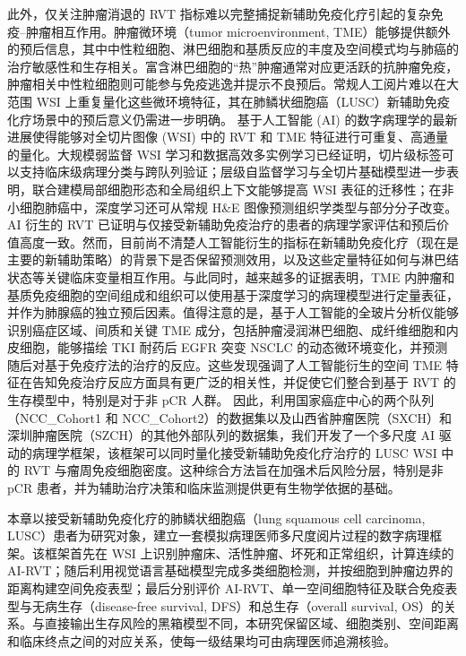 此外，仅关注肿瘤消退的 RVT 指标难以完整捕捉新辅助免疫化疗引起的复杂免疫--肿瘤相互作用。肿瘤微环境（tumor microenvironment, TME）能够提供额外的预后信息，其中中性粒细胞、淋巴细胞和基质反应的丰度及空间模式均与肺癌的治疗敏感性和生存相关\cite{wu2024coldhot,teijeira2021il8,miao2024neutrophilsnsclc,hu2025neutrophilpd1}。富含淋巴细胞的“热”肿瘤通常对应更活跃的抗肿瘤免疫\cite{wu2024coldhot}，肿瘤相关中性粒细胞则可能参与免疫逃逸并提示不良预后\cite{teijeira2021il8,miao2024neutrophilsnsclc,hu2025neutrophilpd1}。常规人工阅片难以在大范围 WSI 上重复量化这些微环境特征，其在肺鳞状细胞癌（LUSC）新辅助免疫化疗场景中的预后意义仍需进一步明确。
基于人工智能 (AI) 的数字病理学的最新进展使得能够对全切片图像 (WSI) 中的 RVT 和 TME 特征进行可重复、高通量的量化。大规模弱监督 WSI 学习和数据高效多实例学习已经证明，切片级标签可以支持临床级病理分类与跨队列验证\cite{campanella2019clinical,lu2021clam,ilse2018attentionmil,li2021dsmil,shao2021transmil}；层级自监督学习与全切片基础模型进一步表明，联合建模局部细胞形态和全局组织上下文能够提高 WSI 表征的迁移性\cite{chen2022hipt,xu2024gigapath}；在非小细胞肺癌中，深度学习还可从常规 H\&E 图像预测组织学类型与部分分子改变\cite{coudray2018lung}。AI 衍生的 RVT 已证明与仅接受新辅助免疫治疗的患者的病理学家评估和预后价值高度一致\cite{dacic2024lcmc3}。然而，目前尚不清楚人工智能衍生的指标在新辅助免疫化疗（现在是主要的新辅助策略）的背景下是否保留预测效用，以及这些定量特征如何与淋巴结状态等关键临床变量相互作用。与此同时，越来越多的证据表明，TME 内肿瘤和基质免疫细胞的空间组成和组织可以使用基于深度学习的病理模型进行定量表征，并作为肺腺癌的独立预后因素\cite{wang2020compstaining,wang2019convpath}。值得注意的是，基于人工智能的全玻片分析仪能够识别癌症区域、间质和关键 TME 成分，包括肿瘤浸润淋巴细胞、成纤维细胞和内皮细胞，能够描绘 TKI 耐药后 EGFR 突变 NSCLC 的动态微环境变化，并预测随后对基于免疫疗法的治疗的反应\cite{bang2025egfrspatial}。这些发现强调了人工智能衍生的空间 TME 特征在告知免疫治疗反应方面具有更广泛的相关性，并促使它们整合到基于 RVT 的生存模型中，特别是对于非 pCR 人群。
因此，利用国家癌症中心的两个队列（NCC\_Cohort1 和 NCC\_Cohort2）的数据集以及山西省肿瘤医院（SXCH）和深圳肿瘤医院（SZCH）的其他外部队列的数据集，我们开发了一个多尺度 AI 驱动的病理学框架，该框架可以同时量化接受新辅助免疫化疗治疗的 LUSC WSI 中的 RVT 与瘤周免疫细胞密度。这种综合方法旨在加强术后风险分层，特别是非 pCR 患者，并为辅助治疗决策和临床监测提供更有生物学依据的基础。


本章以接受新辅助免疫化疗的肺鳞状细胞癌（lung squamous cell carcinoma, LUSC）患者为研究对象，建立一套模拟病理医师多尺度阅片过程的数字病理框架。该框架首先在 WSI 上识别肿瘤床、活性肿瘤、坏死和正常组织，计算连续的 AI-RVT；随后利用视觉语言基础模型完成多类细胞检测，并按细胞到肿瘤边界的距离构建空间免疫表型；最后分别评价 AI-RVT、单一空间细胞特征及联合免疫表型与无病生存（disease-free survival, DFS）和总生存（overall survival, OS）的关系。与直接输出生存风险的黑箱模型不同，本研究保留区域、细胞类别、空间距离和临床终点之间的对应关系，使每一级结果均可由病理医师追溯核验。

